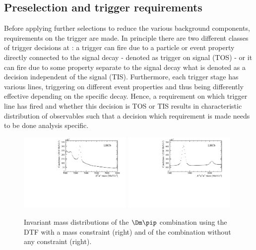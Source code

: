 \subsection{Preselection and trigger requirements}
\label{sec:preselTrigger}

Before applying further selections to reduce the various background components, requirements on the trigger are made.
In principle there are two different classes of trigger decisions at \lhcb: a trigger can fire due to a particle or event property directly connected to the signal decay - denoted as trigger on signal (TOS) - or it can fire due to some property separate to the signal decay what is denoted as a decision independent of the signal (TIS).
Furthermore, each trigger stage has various lines, triggering on different event properties and thus being differently effective depending on the specific decay.
Hence, a requirement on which trigger line has fired and whether this decision is TOS or TIS results in characteristic distribution of observables such that a decision which requirement is made needs to be done analysis specific.
\begin{figure}[tbp]
    \centering
    \includegraphics[width=0.485\textwidth]{07selection/figs/Bmass_afterStrippingAndTrigger.pdf}
    \includegraphics[width=0.485\textwidth]{07selection/figs/Dmass_afterStrippingAndTrigger.pdf}
    \caption{Invariant mass distributions of the $\Dm\pip$ combination using the DTF with a \Dm mass constraint (right) and of the \Kp\pim\pim combination without any constraint (right).}
    \label{fig:BAndDmassAfterStripping}
\end{figure}

